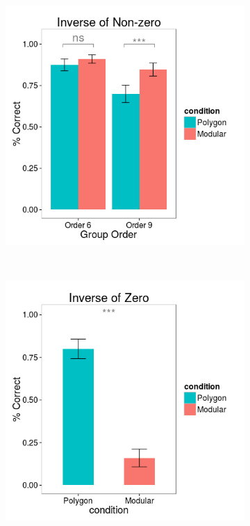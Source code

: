 \documentclass[man,mask,10pt]{apa6}
\begin{document}
\begin{figure}[H]
\centering
\begin{subfigure}[c]{0.3\textwidth}
\centering
\includegraphics[width=\textwidth]{figures/1/in_NZ_r.png}
\end{subfigure}
~
\begin{subfigure}[c]{0.3\textwidth}
\centering
\includegraphics[width=\textwidth]{figures/1/in_Z_r.png}

\end{subfigure}
\end{figure}
\end{document}
